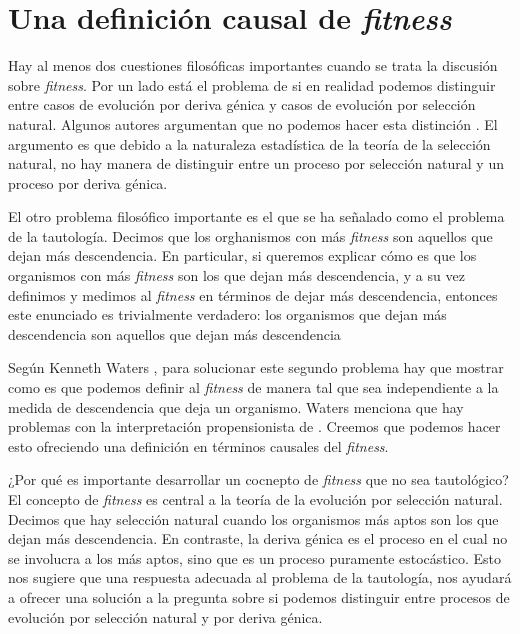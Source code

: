 
\chapter{Una definición causal de \emph{fitness}}


\noindent Hay al menos dos cuestiones filosóficas importantes cuando se trata la discusión sobre \emph{fitness}. Por un lado está el problema de si en realidad podemos distinguir entre casos de evolución por deriva génica y casos de evolución por selección natural. Algunos autores argumentan que no podemos hacer esta distinción \cite{Walsh2002}. El argumento es que debido a la naturaleza estadística de la teoría de la selección natural, no hay manera de distinguir entre un proceso por selección natural y un proceso por deriva génica.

El otro problema filosófico importante es el que se ha señalado como el problema de la tautología. Decimos que los orghanismos con más \emph{fitness} son aquellos que dejan más descendencia. En particular, si queremos explicar cómo es que los organismos con más \emph{fitness} son los que dejan más descendencia, y a su vez definimos y medimos al \emph{fitness} en términos de dejar más descendencia, entonces este enunciado es trivialmente verdadero: los organismos que dejan más descendencia son aquellos que dejan más descendencia \cite{Bouchard2004, Paul1992}

Según Kenneth Waters \cite{Waters1986}, para solucionar este segundo problema hay que mostrar como es que podemos definir al \emph{fitness} de manera tal que sea independiente a la medida de descendencia que deja un organismo. Waters menciona que hay problemas con la interpretación propensionista de . Creemos que podemos hacer esto ofreciendo una definición en términos causales del \emph{fitness}.

¿Por qué es importante desarrollar un cocnepto de \emph{fitness} que no sea tautológico? El concepto de \emph{fitness} es central a la teoría de la evolución por selección natural. Decimos que hay selección natural cuando los organismos más aptos son los que dejan más descendencia. En contraste, la deriva génica es el proceso en el cual no se involucra a los más aptos, sino que es un proceso puramente estocástico. Esto nos sugiere que una respuesta adecuada al problema de la tautología, nos ayudará a ofrecer una solución a la pregunta sobre si podemos distinguir entre procesos de evolución por selección natural y por deriva génica.

